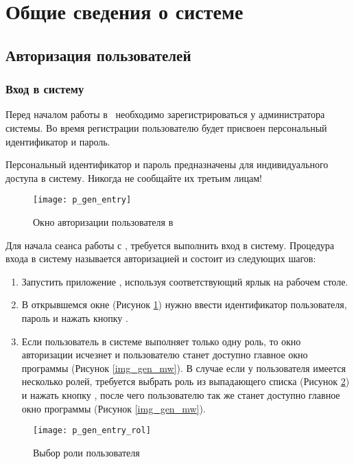 \newpage
\section{Общие сведения о системе}
\subsection{Авторизация пользователей}
\subsubsection{Вход в систему} \label{p_gen_entry}

Перед началом работы в \tmis ~необходимо зарегистрироваться у администратора системы. Во время регистрации пользователю будет присвоен персональный идентификатор и пароль.

\begin{vnim}
 Персональный идентификатор и пароль предназначены для индивидуального доступа в систему. Никогда не сообщайте их третьим лицам!
\end{vnim}

\begin{figure}[ht]\centering
 \texttt{[image: p\_gen\_entry]}
 \caption{Окно авторизации пользователя в \tmis}
 \label{img_gen_entry}
\end{figure} 
    
Для начала сеанса работы с \tmis , требуется выполнить вход в систему. Процедура входа в систему называется авторизацией и состоит из следующих шагов:
\begin{enumerate}
\item Запустить приложение \tmis, используя соответствующий ярлык на рабочем столе.
\item В открывшемся окне (Рисунок \ref{img_gen_entry}) нужно ввести идентификатор пользователя, пароль и нажать кнопку .
\item Если пользователь в системе выполняет только одну роль, то окно авторизации исчезнет и пользователю станет доступно главное окно программы (Рисунок \ref{img_gen_mw}). В случае если у пользователя имеется несколько ролей, требуется выбрать роль из выпадающего списка (Рисунок \ref{img_gen_entry_rol}) и нажать кнопку  , после чего пользователю так же станет доступно главное окно программы (Рисунок \ref{img_gen_mw}).
\end{enumerate}
 
\begin{figure}[ht]\centering
 \texttt{[image: p\_gen\_entry\_rol]}
 \caption{Выбор роли пользователя}
 \label{img_gen_entry_rol}
\end{figure} 

